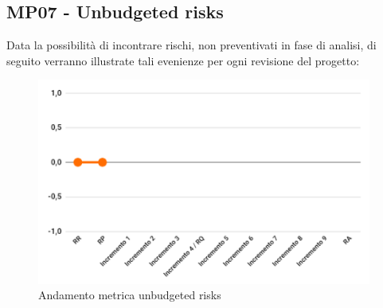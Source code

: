 \subsection{MP07 - Unbudgeted risks}
Data la possibilità di incontrare rischi, non preventivati in fase di analisi, di seguito verranno illustrate tali evenienze per ogni revisione del progetto:
\begin{figure}[H]
	\centering
	\includegraphics[width=11cm]{images/unbudgeted_risks.png}
	\caption{Andamento metrica unbudgeted risks}
\end{figure}


